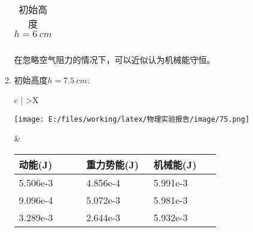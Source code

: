 \documentclass[UTF8]{article}
\begin{document}
\begin{enumerate}
\begin{enumerate}[left=2em, label=\arabic*)]
\begin{table}[H]
\begin{tabularx}{\textwidth}{
                                    c |
                                    >{\centering\arraybackslash}X
                                }
                                \\ \hline
                                \end{tabularx}
                                \caption{初始高度$h=\SI{6}{cm}$}
                                \label{form:60}
                            \end{table}
                            在忽略空气阻力的情况下，可以近似认为机械能守恒。
                        \item 初始高度$h=\SI{7.5}{cm}$:
                            \begin{table}[H]
                                \centering
                                \begin{tabularx}{\textwidth}{
                                    c |
                                    >{\centering\arraybackslash}X
                                }
                                \hline
                                \begin{minipage}{0.45\textwidth}
                                    \centering
                                    \texttt{[image: E:/files/working/latex/物理实验报告/image/75.png]}
                                \end{minipage}
                                &
                                \begin{minipage}{\linewidth}
                                    \begin{tabular}{
                                        || >{\centering\arraybackslash}p{0.248\linewidth}
                                        | >{\centering\arraybackslash}p{0.248\linewidth}
                                        | >{\centering\arraybackslash}p{0.248\linewidth}
                                        ||
                                    }
                                        \hline
                                        动能(J) & 重力势能(J) & 机械能(J)\\ \hline
                                        5.506e-3 & 4.856e-4 & 5.991e-3 \\ \hline
                                        9.096e-4 & 5.072e-3 & 5.981e-3 \\ \hline
                                        3.289e-3 & 2.644e-3 & 5.932e-3\\ \hline
                                    \end{tabular}                                    
                                \end{minipage}


\end{tabularx}
\end{table}
\end{enumerate}
\end{enumerate}
\end{document}
